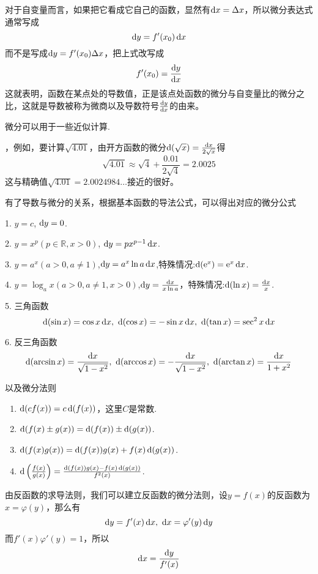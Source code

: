 对于自变量而言，如果把它看成它自己的函数，显然有$\dif x = \Delta x$，所以微分表达式通常写成
\[ \dif y = f'(x_0) \dif x \]
而不是写成$\dif y = f'(x_0) \Delta x$，把上式改写成
\[ f'(x_0) = \frac{\dif y}{\dif x} \]
这就表明，函数在某点处的导数值，正是该点处函数的微分与自变量比的微分之比，这就是导数被称为微商以及导数符号$\frac{\dif y}{\dif x}$的由来。

微分可以用于一些近似计算.

\begin{example}
  ，例如，要计算$\sqrt{4.01}$，由开方函数的微分$\dif (\sqrt{x})=\frac{\dif x}{2 \sqrt{x}}$得
  \[ \sqrt{4.01} \approx \sqrt{4} + \frac{0.01}{2 \sqrt{4}} = 2.0025 \]
  这与精确值$\sqrt{4.01}=2.0024984\ldots$接近的很好。
\end{example}

有了导数与微分的关系，根据基本函数的导法公式，可以得出对应的微分公式

1. $y=c$, $\dif y = 0$.

2. $y=x^p(p \in \mathbb{R},x>0)$, $\dif y = px^{p-1} \dif x$.

3. $y=a^x(a>0,a \neq 1)$,$\dif y=a^x\ln{a} \dif x$,特殊情况:$\dif (\mathrm{e}^x) = \mathrm{e}^x \dif x$.

4. $y=\log_a x(a>0,a\neq 1,x>0)$,$\dif y=\frac{\dif x}{x \ln{a}}$，特殊情况:$\dif (\ln{x}) = \frac{\dif x}{x}$.

5. 三角函数
\[ \dif (\sin{x}) = \cos{x} \dif x, \  \dif (\cos{x}) = -\sin{x} \dif x, \  \dif (\tan{x}) = \sec^2{x} \dif x \]

6. 反三角函数
\[ \dif (\arcsin{x}) = \frac{\dif x}{\sqrt{1-x^2}}, \  \dif (\arccos{x}) = - \frac{\dif x}{\sqrt{1-x^2}}, \ \dif (\arctan{x}) = \frac{\dif x}{1+x^2} \]

以及微分法则
\begin{enumerate}
\item $\dif (cf(x)) = c \dif (f(x))$，这里$C$是常数.
\item $\dif (f(x) \pm g(x)) = \dif (f(x)) \pm \dif (g(x))$.
\item $\dif (f(x)g(x)) = \dif (f(x))g(x) + f(x) \dif (g(x))$.
\item $\dif \left( \frac{f(x)}{g(x)} \right) = \frac{\dif (f(x))g(x) - f(x) \dif (g(x))}{f^2(x)}$.
\end{enumerate}

由反函数的求导法则，我们可以建立反函数的微分法则，设$y=f(x)$的反函数为$x=\varphi(y)$，那么有
\[ \dif y = f'(x) \dif x, \  \dif x = \varphi'(y) \dif y \]
而$f'(x)\varphi'(y)=1$，所以
\[ \dif x = \frac{\dif y}{f'(x)} \]

